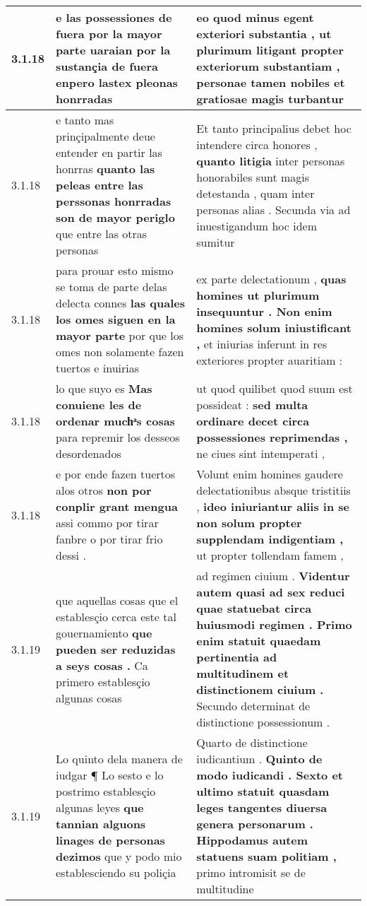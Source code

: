 \begin{tabular}{|p{1cm}|p{6.5cm}|p{6.5cm}|}
3.1.18 & e las possessiones de fuera \textbf{ por la mayor parte uaraian } por la sustançia de fuera enpero lastex pleonas honrradas & eo quod minus egent exteriori substantia , \textbf{ ut plurimum litigant propter exteriorum substantiam , personae } tamen nobiles et gratiosae magis turbantur \\\hline
3.1.18 & e tanto mas prinçipalmente deue entender en partir las honrras \textbf{ quanto las peleas entre las perssonas honrradas son de mayor periglo } que entre las otras personas & Et tanto principalius debet hoc intendere circa honores , \textbf{ quanto litigia } inter personas honorabiles sunt magis detestanda , quam inter personas alias . Secunda via ad inuestigandum hoc idem sumitur \\\hline
3.1.18 & para prouar esto mismo se toma de parte delas delecta connes \textbf{ las quales los omes siguen en la mayor parte } por que los omes non solamente fazen tuertos e inuirias & ex parte delectationum , \textbf{ quas homines ut plurimum insequuntur . Non enim homines solum iniustificant , } et iniurias inferunt in res exteriores propter auaritiam : \\\hline
3.1.18 & lo que suyo es \textbf{ Mas conuiene les de ordenar muchͣs cosas } para repremir los desseos desordenados & ut quod quilibet quod suum est possideat : \textbf{ sed multa ordinare decet circa possessiones reprimendas , } ne ciues sint intemperati , \\\hline
3.1.18 & e por ende fazen tuertos alos otros \textbf{ non por conplir grant mengua } assi commo por tirar fanbre o por tirar frio dessi . & Volunt enim homines gaudere delectationibus absque tristitiis , \textbf{ ideo iniuriantur aliis in se non solum propter supplendam indigentiam , } ut propter tollendam famem , \\\hline
3.1.19 & que aquellas cosas que el establesçio cerca este tal gouernamiento \textbf{ que pueden ser reduzidas a seys cosas . } Ca primero establesçio algunas cosas & ad regimen ciuium . \textbf{ Videntur autem quasi ad sex reduci quae statuebat circa huiusmodi regimen . Primo enim statuit quaedam pertinentia ad multitudinem et distinctionem ciuium . } Secundo determinat de distinctione possessionum . \\\hline
3.1.19 & Lo quinto dela manera de iudgar ¶ Lo sesto e lo postrimo establesçio algunas leyes \textbf{ que tannian alguons linages de personas dezimos } que y podo mio establesciendo su poliçia & Quarto de distinctione iudicantium . \textbf{ Quinto de modo iudicandi . Sexto et ultimo statuit quasdam leges tangentes diuersa genera personarum . Hippodamus autem statuens suam politiam , } primo intromisit se de multitudine \\\hline

\end{tabular}

